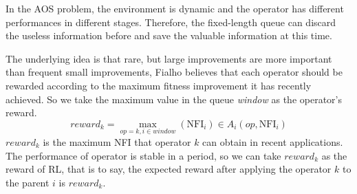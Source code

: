 \documentclass[journal]{IEEEtran}
\begin{document}
In the AOS problem, the environment is dynamic and the operator has different performances in different stages. Therefore, the fixed-length queue can discard the useless information before and save the valuable information at this time.

The underlying idea is that rare, but large improvements are more important than frequent small improvements, Fialho \cite{fialho2010comparison} believes that each operator should be rewarded according to the maximum fitness improvement it has recently achieved.
So we take the maximum value in the queue \textit{window} as the operator's reward.
\begin{equation}
  reward_k = \max_{op=k, i\in \textit{window}}(\text{NFI}_i) \in A_i(op,\text{NFI}_i)
\end{equation}
$reward_k$ is the maximum NFI that operator $k$ can obtain in recent applications.
The performance of operator is stable in a period, so we can take $reward_k$ as the reward of RL, that is to say, the expected reward after applying the operator $k$ to the parent $i$ is $reward_k$.
\end{document}
